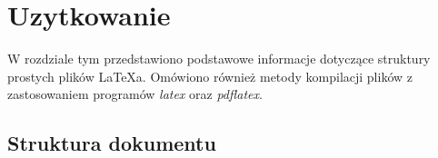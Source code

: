 \chapter{Uzytkowanie}
\label{cha:uzytkowanie}

W rozdziale tym przedstawiono podstawowe informacje dotyczące struktury prostych plików \LaTeX a. Omówiono również metody kompilacji plików z zastosowaniem programów \emph{latex} oraz \emph{pdflatex}.


\section{Struktura dokumentu}
\label{sec:strukturaDokumentu}



